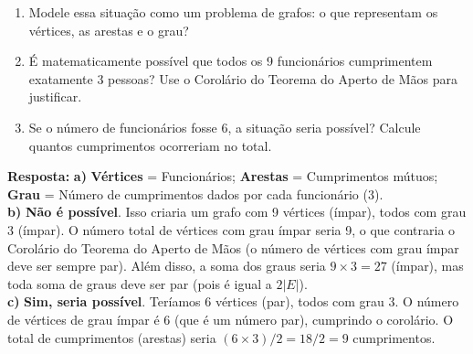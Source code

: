 \documentclass[12pt]{article}
\newcommand{\quadro}[1]{\vspace{0.2cm}\begin{tcolorbox}[colback=green!5, colframe=forestgreen, boxrule=0.5pt, arc=0pt] \textbf{Resposta:} #1 \end{tcolorbox}}
\begin{document}
\begin{enumerate}[label=\arabic*), leftmargin=1.5cm, itemsep=0.8cm]
\begin{enumerate}[label=\alph*)]
    \item Modele essa situação como um problema de grafos: o que representam os vértices, as arestas e o grau?
    \item É matematicamente possível que todos os 9 funcionários cumprimentem exatamente 3 pessoas? Use o Corolário do Teorema do Aperto de Mãos para justificar.
    \item Se o número de funcionários fosse 6, a situação seria possível? Calcule quantos cumprimentos ocorreriam no total.
\end{enumerate}
\quadro{
\textbf{a)} \textbf{Vértices} = Funcionários; \textbf{Arestas} = Cumprimentos mútuos; \textbf{Grau} = Número de cumprimentos dados por cada funcionário (3). \\
\textbf{b)} \textbf{Não é possível}. Isso criaria um grafo com 9 vértices (ímpar), todos com grau 3 (ímpar). O número total de vértices com grau ímpar seria 9, o que contraria o Corolário do Teorema do Aperto de Mãos (o número de vértices com grau ímpar deve ser sempre par). Além disso, a soma dos graus seria $9 \times 3 = 27$ (ímpar), mas toda soma de graus deve ser par (pois é igual a $2|E|$). \\
\textbf{c)} \textbf{Sim, seria possível}. Teríamos 6 vértices (par), todos com grau 3. O número de vértices de grau ímpar é 6 (que é um número par), cumprindo o corolário. O total de cumprimentos (arestas) seria $(6 \times 3) / 2 = 18 / 2 = 9$ cumprimentos.
}


\end{enumerate}
\end{document}
